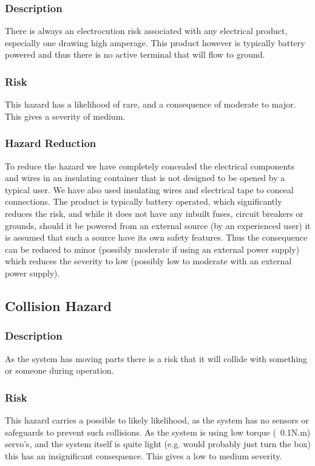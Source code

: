 \documentclass[]{report}
\begin{document}
\subsubsection{Description}
There is always an electrocution risk associated with any electrical product, especially one drawing high amperage. This product however is typically battery powered and thus there is no active terminal that will flow to ground.

\subsubsection{Risk}
This hazard has a likelihood of rare, and a consequence of moderate to major. This gives a severity of medium.

\subsubsection{Hazard Reduction}
To reduce the hazard we have completely concealed the electrical components and wires in an insulating container that is not designed to be opened by a typical user. We have also used insulating wires and electrical tape to conceal connections. The product is typically battery operated, which significantly reduces the risk, and while it does not have any inbuilt fuses, circuit breakers or grounds, should it be powered from an external source (by an experienced user) it is assumed that such a source have its own safety features. Thus the consequence can be reduced to minor (possibly moderate if using an external power supply) which reduces the severity to low (possibly low to moderate with an external power supply).

\subsection{Collision Hazard}
\subsubsection{Description}
As the system has moving parts there is a risk that it will collide with something or someone during operation.

\subsubsection{Risk}
This hazard carries a possible to likely likelihood, as the system has no sensors or safeguards to prevent such collisions. As the system is using low torque (~0.1N.m) servo's, and the system itself is quite light (e.g. would probably just turn the box) this has an insignificant consequence. This gives a low to medium severity.
\end{document}
